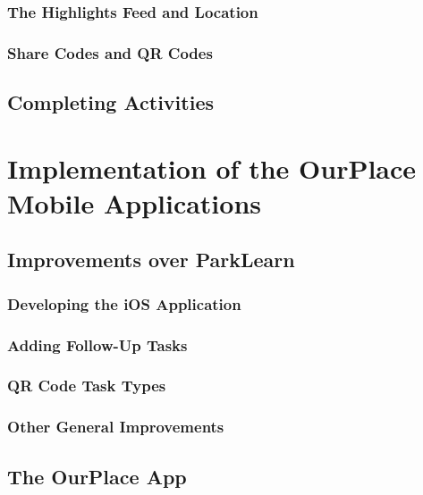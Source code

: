 \subsubsection{The Highlights Feed and Location}

\subsubsection{Share Codes and QR Codes}

\subsection{Completing Activities}

\section{Implementation of the OurPlace Mobile Applications}
\label{sec:ImplementationMobile}

\subsection{Improvements over ParkLearn}

\subsubsection{Developing the iOS Application}

\subsubsection{Adding Follow-Up Tasks}

\subsubsection{QR Code Task Types}

\subsubsection{Other General Improvements}


\subsection{The OurPlace App}

